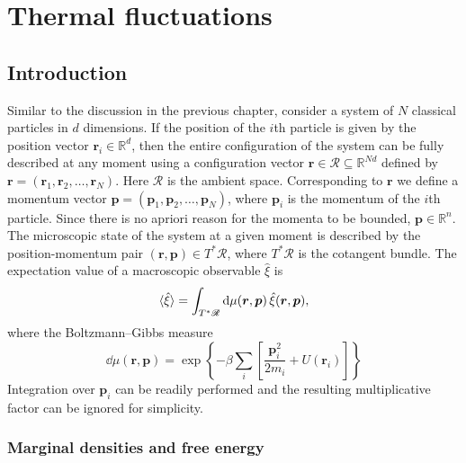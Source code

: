 
\chapter{Thermal fluctuations}
\label{chap03}



\section{Introduction}

Similar to the discussion in the previous chapter, consider a system of $N$ classical particles in $d$ dimensions.
If the position of the $i$th particle is given by the position vector $\bm{r}_{i} \in \mathbb{R}^{d}$, then the entire configuration of the system can be fully described at any moment using a configuration vector $\bm{r} \in \mathscr{R} \subseteq \mathbb{R}^{Nd}$ defined by $\bm{r} = (\bm{r}_{1}, \bm{r}_{2}, \ldots, \bm{r}_{N})$.
  Here $\mathscr{R}$ is the ambient space.%
Corresponding to $\bm{r}$ we define a momentum vector $\bm{p} = (\bm{p}_{1}, \bm{p}_{2}, \ldots, \bm{p}_{N})$, where $\bm{p}_{i}$ is the momentum of the $i$th particle.
Since there is no apriori reason for the momenta to be bounded, $\bm{p} \in \mathbb{R}^{n}$.
The microscopic state of the system at a given moment is described by the position-momentum pair $(\bm{r}, \bm{p}) \in T^{*}\mathscr{R}$, where $T^{*}\mathscr{R}$ is the cotangent bundle.
The expectation value of a macroscopic observable $\hat{\xi}$ is
%
\begin{equation}
  \mathinner{\langle{\hat{\xi}}\rangle} = \int_{T^{*}\mathscr{R}} \mathrm{d}\mu(\bm{r}, \bm{p})\, \hat{\xi}(\bm{r}, \bm{p}),
\end{equation}
%
where the Boltzmann--Gibbs measure
%
\begin{equation}
  \dd{\mu}(\bm{r}, \bm{p}) = \exp\left\{-\beta\sum_{i}\left[\frac{\bm{p}_{i}^{2}}{2m_{i}} + U(\bm{r}_{i})\right]\right\}
\end{equation}
%
Integration over $\bm{p}_{i}$ can be readily performed and the resulting multiplicative factor can be ignored for simplicity.

\subsection{Marginal densities and free energy}

